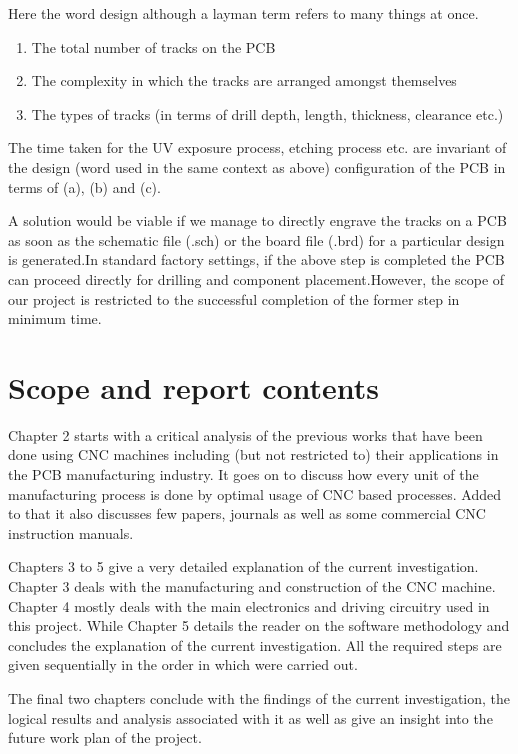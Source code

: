 Here the word design although a layman term refers to many things at once. 
\begin{enumerate}
    \item The total number of tracks on the PCB
    \item The complexity in which the tracks are arranged amongst themselves
    \item The types of tracks (in terms of drill depth, length, thickness, clearance etc.)
\end{enumerate}

The time taken for the UV exposure process, etching process etc. are invariant of the design (word used in the same context as above) configuration of the PCB in terms of (a), (b) and (c). \par

A solution would be viable if we manage to directly engrave the tracks on a PCB as soon as the schematic file (.sch) or the board file (.brd) for a particular design is generated.In standard factory settings, if the above step is completed the PCB can proceed directly for drilling and component placement.However, the scope of our project is restricted to the successful completion of the former step in minimum time.



\section{Scope and report contents}
Chapter 2 starts with a critical analysis of the previous works that have been done using CNC machines including (but not restricted to) their applications in the PCB manufacturing industry. It goes on to discuss how every unit of the manufacturing process is done by optimal usage of CNC based processes. Added to that it also discusses few papers, journals as well as some commercial CNC instruction manuals. \par

Chapters 3 to 5 give a very detailed explanation of the current investigation. Chapter 3 deals with the manufacturing and construction of the CNC machine. Chapter 4 mostly deals with the main electronics and driving circuitry used in this project. While Chapter 5 details the reader on the software methodology and concludes the explanation of the current investigation. All the required steps are given sequentially in the order in which were carried out. \par

The final two chapters conclude with the findings of the current investigation, the logical results and analysis associated with it as well as give an insight into the future work plan of the project. 